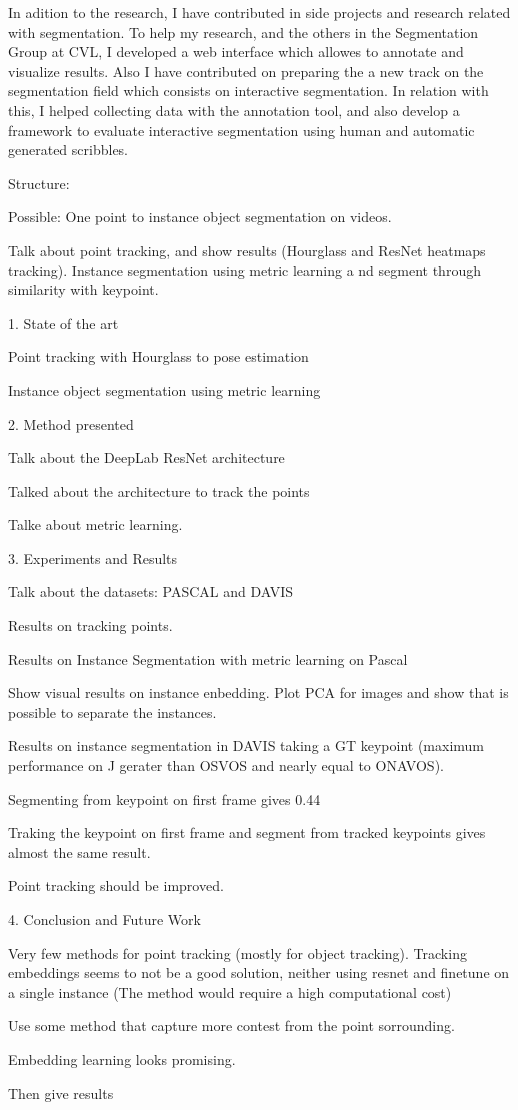 In adition to the research, I have contributed in side projects and research related with segmentation.
To help my research, and the others in the Segmentation Group at CVL, I developed a web interface which allowes to annotate and visualize results.
Also I have contributed on preparing the a new track on the segmentation field which consists on interactive segmentation. In relation with this, I helped collecting data with the annotation tool, and also develop a framework to evaluate interactive segmentation using human and automatic generated scribbles.




Structure:

Possible: One point to instance object segmentation on videos.

Talk about point tracking, and show results (Hourglass and ResNet heatmaps tracking).
Instance segmentation using metric learning a nd segment through similarity with keypoint.

1. State of the art

Point tracking with Hourglass to pose estimation

Instance object segmentation using metric learning


2. Method presented

Talk about the DeepLab ResNet architecture

Talked about the architecture to track the points

Talke about metric learning.

3. Experiments and Results

Talk about the datasets: PASCAL and DAVIS

Results on tracking points.

Results on Instance Segmentation with metric learning on Pascal

Show visual results on instance enbedding. Plot PCA for images and show that is possible to separate the instances.

Results on instance segmentation in DAVIS taking a GT keypoint (maximum performance on J gerater than OSVOS and nearly equal to ONAVOS).

Segmenting from keypoint on first frame gives 0.44

Traking the keypoint on first frame and segment from tracked keypoints gives almost the same result.

Point tracking should be improved.

4. Conclusion and Future Work

Very few methods for point tracking (mostly for object tracking). Tracking embeddings seems to not be a good solution, neither using resnet and finetune on a single instance (The method would require a high computational cost)

Use some method that capture more contest from the point sorrounding.

Embedding learning looks promising.



Then give results
